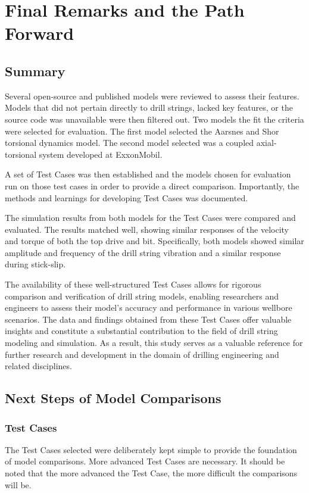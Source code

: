 \chapter{Final Remarks and the Path Forward}
\section{Summary}
Several open-source and published models were reviewed to assess their features.  Models that did not pertain directly to drill strings, lacked key features, or the source code was unavailable were then filtered out.  Two models the fit the criteria were selected for evaluation.  The first model selected the Aarsnes and Shor torsional dynamics model.  The second model selected was a coupled axial-torsional system developed at ExxonMobil.

A set of Test Cases was then established and the models chosen for evaluation run on those test cases in order to provide a direct comparison.  Importantly, the methods and learnings for developing Test Cases was documented.  

The simulation results from both models for the Test Cases were compared and evaluated. The results matched well, showing similar responses of the velocity and torque of both the top drive and bit. Specifically, both models showed similar amplitude and frequency of the drill string vibration and a similar response during stick-slip.

The availability of these well-structured Test Cases allows for rigorous comparison and verification of drill string models, enabling researchers and engineers to assess their model's accuracy and performance in various wellbore scenarios. The data and findings obtained from these Test Cases offer valuable insights and constitute a substantial contribution to the field of drill string modeling and simulation. As a result, this study serves as a valuable reference for further research and development in the domain of drilling engineering and related disciplines.

\section{Next Steps of Model Comparisons}
\subsection{Test Cases}
The Test Cases selected were deliberately kept simple to provide the foundation of model comparisons.  More advanced Test Cases are necessary.  It should be noted that the more advanced the Test Case, the more difficult the comparisons will be.

